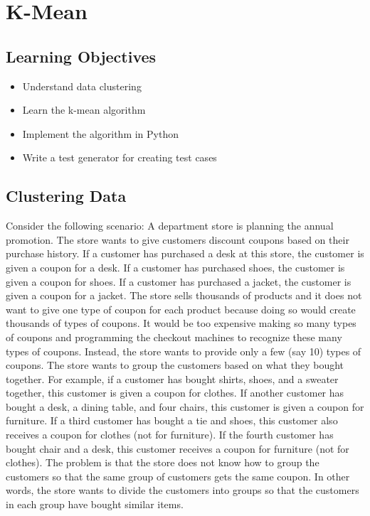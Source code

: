 \chapter{K-Mean}

\section{Learning Objectives}

\begin{itemize}

\item Understand data clustering  
  
\item Learn the k-mean algorithm

\item Implement the algorithm in Python

\item Write a test generator for creating test cases
  
\end{itemize}

\section{Clustering Data}

Consider the following scenario: A department store is planning the
annual promotion. The store wants to give customers discount coupons
based on their purchase history.  If a customer has purchased a desk
at this store, the customer is given a coupon for a desk.
 If a customer has purchased shoes,
the customer is given a coupon for shoes.  If a customer has purchased
a jacket, the customer is given a coupon for a jacket.  The store
sells thousands of products and it does not want to give one type of
coupon for each product because doing so would create thousands of
types of coupons.  It would be too expensive making so many types of
coupons and programming the checkout machines to recognize these many
types of coupons.  Instead, the store wants to provide only a few (say
10) types of coupons.  The store wants to group the customers based on
what they bought together.  For example, if a customer has bought
shirts, shoes, and a sweater together, this customer is given a
coupon for clothes.  If another customer has bought a desk, a dining
table, and four chairs, this customer is given a coupon for furniture.
If a third customer has bought a tie and shoes, this customer also
receives a coupon for clothes (not for furniture).  If the fourth
customer has bought chair and a desk, this customer receives a coupon
for furniture (not for clothes).  The problem is that the store does
not know how to group the customers so that the same group of
customers gets the same coupon.  In other words, the store wants to
divide the customers into groups so that the customers in each group
have bought similar items. 


